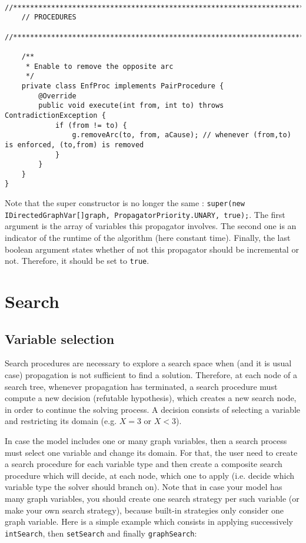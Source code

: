 \documentclass{article}
\begin{document}
\begin{lstlisting}
    //***********************************************************************************
    // PROCEDURES
    //***********************************************************************************

    /**
     * Enable to remove the opposite arc
     */
    private class EnfProc implements PairProcedure {
        @Override
        public void execute(int from, int to) throws ContradictionException {
            if (from != to) {
                g.removeArc(to, from, aCause); // whenever (from,to) is enforced, (to,from) is removed
            }
        }
    }
}
\end{lstlisting}

Note that the super constructor is no longer the same : \texttt{super(new IDirectedGraphVar[]{graph}, PropagatorPriority.UNARY, true);}. 
The first argument is the array of variables this propagator involves. The second one is an indicator of the runtime of the algorithm (here constant time). Finally, the last boolean argument states whether of not this propagator should be incremental or not. Therefore, it should be set to \texttt{true}.

\newpage{}
\section{Search}

\subsection{Variable selection}

Search procedures are necessary to explore a search space when (and it is usual case) propagation is not sufficient to find a solution. 
Therefore, at each node of a search tree, whenever propagation has terminated, a search procedure must compute a new decision (refutable hypothesis), which creates a new search node, in order to continue the solving process. A decision consists of selecting a variable and restricting its domain (e.g. $X=3$ or $X<3$). 

In case the model includes one or many graph variables, then a search process must select one variable and change its domain. 
For that, the user need to create a search procedure for each variable type and then create a composite search procedure which will decide, at each node, which one to apply (i.e. decide which variable type the solver should branch on). Note that in case your model has many graph variables, you should create one search strategy per such variable (or make your own search strategy), because built-in strategies only consider one graph variable. Here is a simple example which consists in applying successively \texttt{intSearch}, then \texttt{setSearch} and finally \texttt{graphSearch}:
\end{document}
